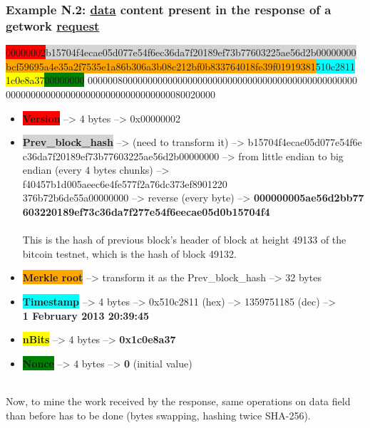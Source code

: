 \subsubsection{Example N.2: \underline{data} content present in the response of a getwork \underline{request}}

\colorbox{red}{00000002}\colorbox{lightgray}
{b15704f4ecae05d077e54f6ec36da7f20189ef73b77603225ae56d2b00000000}\\\colorbox{orange}{bcf59695a4e35a2f7535e1a86b306a3b08c212bf0b833764018fe39f01919381}\colorbox{cyan}{510c2811}\\\colorbox{yellow}{1c0e8a37}\colorbox{green}{00000000} 000000800000000000000000000000000000000000000000000000\\000000000000000000000000000000000080020000

\begin{itemize}
    \item \colorbox{red}{\textbf{Version}} --> 4 bytes --> 0x00000002  
    \item \colorbox{lightgray} {\textbf{Prev\_block\_hash}} --> (need to transform it) -->
    b15704f4ecae05d077e54f6e\\c36da7f20189ef73b77603225ae56d2b00000000 --> from little endian to big endian (every 4 bytes chunks) --> 
    f40457b1d005aeec6e4fe577f2a76dc373ef8901220\\376b72b6de55a00000000 --> reverse (every byte) --> \textbf{
    000000005ae56d2bb77\\603220189ef73c36da7f277e54f6eecae05d0b15704f4} \\\\
    This is the hash of previous block's header of  block at height 49133 of the bitcoin testnet, which is the hash of block 49132.
    \item \colorbox{orange}{\textbf{Merkle root}} --> transform it as the Prev\_block\_hash --> 32 bytes  
    \item \colorbox{cyan}{\textbf{\textbf{Timestamp}}} --> 4 bytes -->  0x510c2811 (hex) --> 1359751185 (dec) --> \\\textbf{1 February 2013 20:39:45}  
    \item \colorbox{yellow}{\textbf{\textbf{nBits}}} --> 4 bytes --> \textbf{0x1c0e8a37} 
    \item \colorbox{green}{\textbf{\textbf{Nonce}}} --> 4 bytes --> \textbf{0} (initial value)\\\\ 
\end{itemize}
Now, to mine the work received by the response, same operations on data field than before has to be done (bytes swapping, hashing twice SHA-256). \\
